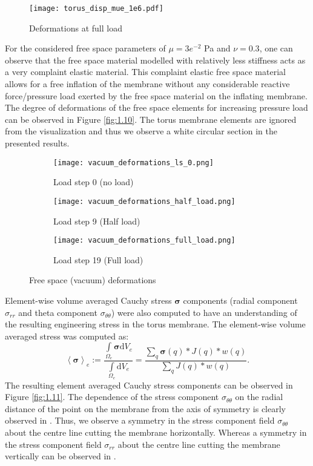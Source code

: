 \begin{figure}[h!]
\centering
\texttt{[image: torus\_disp\_mue\_1e6.pdf]}
\caption{Deformations at full load}
\label{fig:1.9}
\end{figure}

For the considered free space parameters of $\mu = 3e^{-2}$ Pa and $\nu = 0.3$, one can observe that the free space material modelled with relatively less stiffness acts as a very complaint elastic material. This complaint elastic free space material allows for a free inflation of the membrane without any considerable reactive force/pressure load exerted by the free space material on the inflating membrane. The degree of deformations of the free space elements for increasing pressure load can be observed in Figure \eqref{fig:1.10}. The torus membrane elements are ignored from the visualization and thus we observe a white circular section in the presented results.\par 

\begin{figure}[h!]
\centering 
\begin{subfigure}[b]{0.32\textwidth}
\centering
\texttt{[image: vacuum\_deformations\_ls\_0.png]}
\caption{Load step 0 (no load)}
\label{fig:1.10.1}
\end{subfigure}
\begin{subfigure}[b]{0.32\textwidth}
\centering
\texttt{[image: vacuum\_deformations\_half\_load.png]}
\caption{Load step 9 (Half load)}
\label{fig:1.10.2}
\end{subfigure}
\begin{subfigure}[b]{0.32\textwidth}
\centering
\texttt{[image: vacuum\_deformations\_full\_load.png]}
\caption{Load step 19 (Full load)}
\label{fig:1.10.3}
\end{subfigure}
\caption{Free space (vacuum) deformations}
\label{fig:1.10}
\end{figure}

Element-wise volume averaged Cauchy stress $\bm{\sigma}$ components (radial component $\sigma_{rr}$ and theta component $\sigma_{\theta \theta}$) were also computed to have an understanding of the resulting engineering stress in the torus membrane. The element-wise volume averaged stress was computed as:
\begin{equation}
\left\langle \bm{\sigma} \right\rangle_e := \dfrac{\int\limits_{\Omega_{e}} \bm{\sigma} \mathrm{d}V_e}{\int\limits_{\Omega_{e}} \mathrm{d}V_e} = \dfrac{\sum\limits_{q} \bm{\sigma}(q) * J(q) * w(q)}{\sum\limits_{q} J(q) * w(q)}.
\end{equation}  
The resulting element averaged Cauchy stress components can be observed in Figure \eqref{fig:1.11}. The dependence of the stress component $\sigma_{\theta \theta}$ on the radial distance of the point on the membrane from the axis of symmetry is clearly observed in . Thus, we observe a symmetry in the stress component field $\sigma_{\theta \theta}$ about the centre line cutting the membrane horizontally. Whereas a symmetry in the stress component field $\sigma_{rr}$ about the centre line cutting the membrane vertically can be observed in . \par 
 
